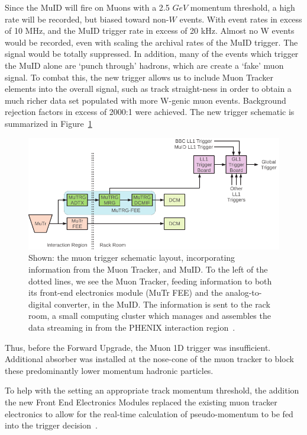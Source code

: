 Since the MuID will fire on Muons with a 2.5 $GeV$ momentum threshold, a high
rate will be recorded, but biased toward non-$W$ events. With event rates in
excess of 10 MHz, and the MuID trigger rate in excess of 20 kHz. Almost no W
events would be recorded, even with scaling the archival rates of the MuID
trigger. The signal would be totally suppressed. In addition, many of the events
which trigger the MuID alone are `punch through' hadrons, which are create a 
`fake' muon signal. To combat this, the new trigger allows us to include Muon
Tracker elements into the overall signal, such as track straight-ness in order
to obtain a much richer data set populated with more W-genic muon events.
Background rejection factors in excess of 2000:1 were achieved. The new trigger
schematic is summarized in Figure~\ref{fig:mutrig_layout}

\begin{figure}[ht]
  \includegraphics[width=\linewidth]{./figures/oide_mutr_layout.pdf}
  \caption{
    Shown: the muon trigger schematic layout, incorporating information from the
    Muon Tracker, and MuID. To the left of the dotted lines, we see the Muon
    Tracker, feeding information to both its front-end electronics module (MuTr
    FEE) and the analog-to-digital converter, in the MuID. The information is
    sent to the rack room, a small computing cluster which manages and assembles
    the data streaming in from the PHENIX interaction region~\cite{Oide2012}.
  }
  \label{fig:mutrig_layout}
\end{figure}


Thus, before the Forward Upgrade, the Muon 1D trigger was insufficient.
Additional absorber was installed at the nose-cone of the muon tracker to block
these predominantly lower momentum hadronic particles. 

To help with the setting an appropriate track momentum threshold, the addition
the new Front End Electronics Modules replaced the existing muon tracker
electronics to allow for the real-time calculation of pseudo-momentum to be fed
into the trigger decision~\cite{Fukao2011}.

